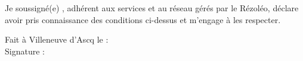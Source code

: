 \documentclass[12pt]{article}
\begin{document}
\vspace*{0.5cm}

Je soussigné(e) \makebox[75mm]{\dotfill}, adhérent aux services et au réseau gérés par le Rézoléo,
déclare avoir pris connaissance des conditions ci-dessus et m'engage à les respecter.

\vspace*{0.5cm}

\begin{flushright}
	\begin{minipage}{0.5\linewidth}
		Fait à Villeneuve d'Ascq le : \dotfill\\
		Signature :
	\end{minipage}
\end{flushright}
\end{document}
